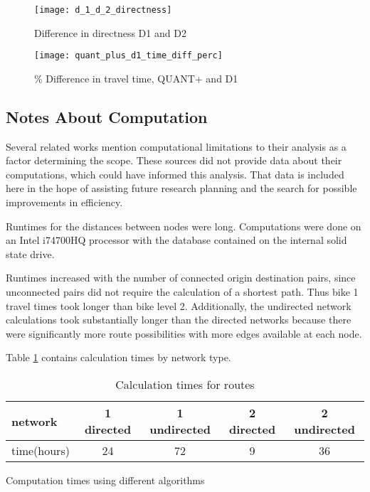 \begin{figure}
\centering
\texttt{[image: d\_1\_d\_2\_directness]}
\caption{Difference in directness D1 and D2}
\label{fig:d1_d2_directness}
\end{figure}

\begin{figure}
\centering
\texttt{[image: quant\_plus\_d1\_time\_diff\_perc]}
\caption{\% Difference in travel time, QUANT+ and D1}
\label{fig:quant_d1_time}
\end{figure}

\subsection{Notes About Computation}

Several related works mention computational limitations to their analysis as a factor determining the scope. These sources did not provide data about their computations, which could have informed this analysis. That data is included here in the hope of assisting future research planning and the search for possible improvements in efficiency. 

Runtimes for the distances between nodes were long. Computations were done on an Intel i74700HQ processor with the database contained on the internal solid state drive. 

Runtimes increased with the number of connected origin destination pairs, since unconnected pairs  did not require the calculation of a shortest path. Thus bike 1 travel times took longer than bike level 2. Additionally, the undirected network calculations took substantially longer than the directed networks because there were significantly more route possibilities with more edges available at each node. 
%

Table \ref{table:net_calc_times} contains calculation times by network type. 

\begin{table}[]
\centering
\begin{tabular}{@{}lcccc@{}}
network     & 1 directed  & 1 undirected & 2 directed  & 2 undirected \\ 
\midrule
time(hours) & 24 & 72  & 9 & 36 \\ \bottomrule
\end{tabular}
\caption{Calculation times for routes}
\label{table:net_calc_times}
\end{table}

\begin{table}
\centering
\caption{Computation times using different algorithms}
\label{table:comp_times_algo}
\end{table}
